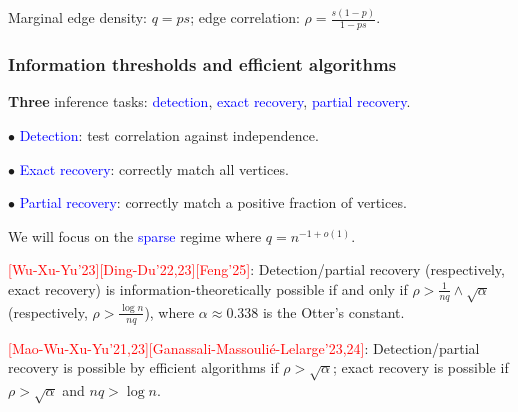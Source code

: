 \documentclass{beamer}
\theoremstyle{plain}
\theoremstyle{definition}
\newcommand{\red}{\textcolor{red}}
\newcommand{\blue}{\textcolor{blue}}
\begin{document}
\begin{frame}
\begin{center}
\end{center}

\pause \pause \pause

\pause Marginal edge density: $q=ps$; edge correlation: $\rho=\tfrac{s(1-p)}{1-ps}$.

\end{frame}






\begin{frame}
\frametitle{Information thresholds and efficient algorithms}

{\bf Three} inference tasks: \blue{detection}, \blue{exact recovery}, \blue{partial recovery}.

$\bullet$ \blue{Detection}: test correlation against independence.

$\bullet$ \blue{Exact recovery}: correctly match all vertices.

$\bullet$ \blue{Partial recovery}: correctly match a positive fraction of vertices.

\medskip

\pause We will focus on the \blue{sparse} regime where $q=n^{-1+o(1)}$.

\medskip

\pause \red{[Wu-Xu-Yu'23][Ding-Du'22,23][Feng'25]}: Detection/partial recovery (respectively, exact recovery) is information-theoretically possible if and only if $\rho>\tfrac{1}{nq}\wedge\sqrt{\alpha}$ (respectively, $\rho>\tfrac{\log n}{nq}$), where $\alpha\approx 0.338$ is the Otter's constant.

\medskip

\pause \red{[Mao-Wu-Xu-Yu'21,23][Ganassali-Massouli\'e-Lelarge'23,24]}: Detection/partial recovery is possible by efficient algorithms if $\rho>\sqrt{\alpha}$; exact recovery is possible if $\rho>\sqrt{\alpha}$ and $nq>\log n$.



\end{frame}
\end{document}
